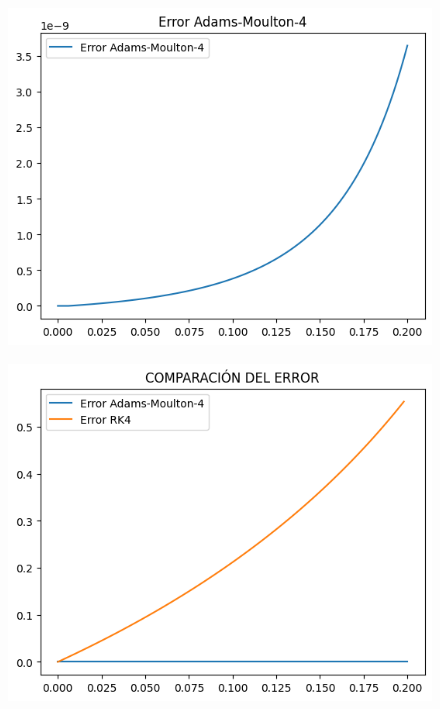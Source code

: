 \begin{frame}
    \begin{figure}[ht!]
        \centering
        \includegraphics[width=.7\paperwidth]{p12-Error-AM.png}
    \end{figure}
\end{frame}

\begin{frame}
    \begin{figure}[ht!]
        \centering
        \includegraphics[width=.7\paperwidth]{p12-Comp-error.png}
    \end{figure}
\end{frame}